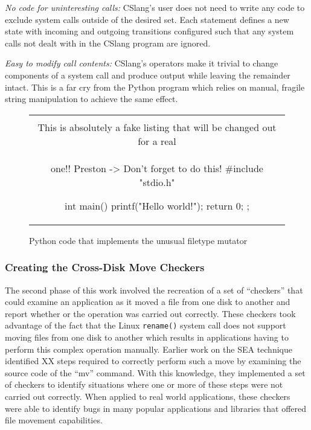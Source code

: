 \textit{No code for uninteresting calls:} CSlang's user does
not need to write any code to exclude system
calls outside of the desired set.  Each statement defines a new state with
incoming and outgoing transitions configured such that any system calls not
dealt with in the CSlang program are ignored.

\textit{Easy to modify call contents:}  CSlang's operators make it
trivial to change components of a system call
and produce output while leaving the remainder intact.  This is a far cry
from the Python program which relies on manual, fragile string manipulation
to achieve the same effect.


\begin{figure}[H]
\centering
\begin{tabular}{c}
\begin{lstlisting}
\\ This is absolutely a fake listing that will be changed out for a real
\\ one!!  Preston -> Don't forget to do this!
#include "stdio.h"

int main() {
    printf("Hello world!\n");
    return 0;
};
\end{lstlisting}
\end{tabular}
\caption{Python code that implements the unusual filetype mutator}
\label{lst:UnusualFiletypePython}
\end{figure}

\subsubsection{Creating the Cross-Disk Move Checkers}

The second phase of this work involved the recreation of a set of
``checkers'' that could examine an application as it moved a file from one
disk to another and report whether or the operation was carried
out correctly.  These checkers took advantage of the fact that the Linux
{\tt rename()} system call does not support moving files from one disk to
another which results in applications having to perform this complex
operation manually.  Earlier work on the SEA technique
identified XX steps required to
correctly perform such a move by examining the source code of the ``mv''
command.  With this knowledge, they
implemented a set of checkers to identify situations where one
or more of these steps were not carried out correctly.
When applied to real world applications,
these checkers were able to identify bugs
in many popular applications and libraries that offered file movement
capabilities.

